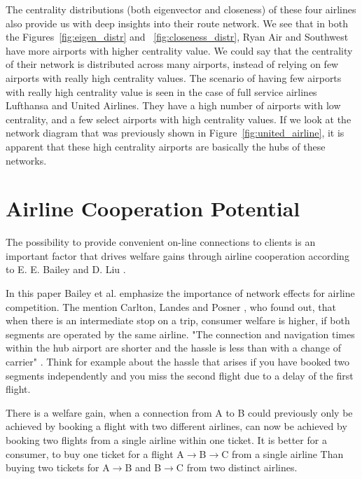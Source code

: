 \documentclass[twocolumn]{tum-article}
\begin{document}
The centrality distributions (both eigenvector and closeness) of these four airlines also provide us with deep insights into their route network. 
We see that in both the Figures~\ref{fig:eigen_distr} and ~\ref{fig:closeness_distr}, Ryan Air and Southwest have more airports with higher centrality value.
We could say that the centrality of their network is distributed across many airports, instead of relying on few airports with really high centrality values. 
The scenario of having few airports with really high centrality value is seen in the case of full service airlines Lufthansa and United Airlines. They have a high number of airports with low centrality, and a few select airports with high centrality values.
If we look at the network diagram that was previously shown in Figure~\ref{fig:united_airline}, it is apparent that these high centrality airports are basically the hubs of these networks.  

\section{Airline Cooperation Potential}

The possibility to provide convenient on-line connections to clients is an important factor that drives welfare gains through airline cooperation according to E. E. Bailey and D. Liu \cite{airline_consolidation_and_consumer_welfare}.

In this paper Bailey et al. emphasize the importance of network effects for airline competition. The mention Carlton, Landes and Posner \cite{costs-and-benefits-of-airline-mergers}, who found out, that when there is an intermediate stop on a trip, consumer welfare is higher, if both segments are operated by the same airline. 
"The connection and navigation times within the hub airport are shorter and the hassle is less than with a change of carrier" \cite{airline_consolidation_and_consumer_welfare}. 
Think for example about the hassle that arises if you have booked two segments independently and you miss the second flight due to a delay of the first flight. 

There is a welfare gain, when a connection from A to B could previously only be achieved by booking a flight with two different airlines, can now be achieved by booking two flights from a single airline within one ticket. 
It is better for a consumer, to buy one ticket for a flight \mbox{A$\rightarrow$B$\rightarrow$C} from a single airline 
Than buying two tickets for \mbox{A$\rightarrow$B} and \mbox{B$\rightarrow$C} from two distinct airlines.
\end{document}
